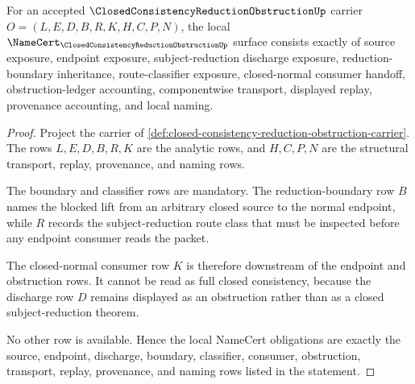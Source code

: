 \begin{theorem}
\label{thm:closed-consistency-reduction-obstruction-namecert-obligations}
For an accepted $\ClosedConsistencyReductionObstructionUp$ carrier $O=(L,E,D,B,R,K,H,C,P,N)$, the local $\NameCert_{\ClosedConsistencyReductionObstructionUp}$ surface consists exactly of source exposure, endpoint exposure, subject-reduction discharge exposure, reduction-boundary inheritance, route-classifier exposure, closed-normal consumer handoff, obstruction-ledger accounting, componentwise transport, displayed replay, provenance accounting, and local naming.
\end{theorem}
\begin{proof}
Project the carrier of \autoref{def:closed-consistency-reduction-obstruction-carrier}. The rows $L,E,D,B,R,K$ are the analytic rows, and $H,C,P,N$ are the structural transport, replay, provenance, and naming rows.

The boundary and classifier rows are mandatory. The reduction-boundary row $B$ names the blocked lift from an arbitrary closed source to the normal endpoint, while $R$ records the subject-reduction route class that must be inspected before any endpoint consumer reads the packet.

The closed-normal consumer row $K$ is therefore downstream of the endpoint and obstruction rows. It cannot be read as full closed consistency, because the discharge row $D$ remains displayed as an obstruction rather than as a closed subject-reduction theorem.

No other row is available. Hence the local NameCert obligations are exactly the source, endpoint, discharge, boundary, classifier, consumer, obstruction, transport, replay, provenance, and naming rows listed in the statement.
\end{proof}

